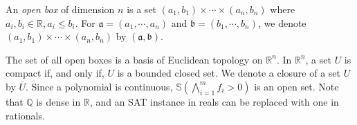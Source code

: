 \documentclass[runningheads,a4paper,oribibl]{llncs}
\newcommand{\Real}{{\mathbb R}}
\newcommand{\Rat}{{\mathbb Q}}
\newcommand{\suppress}[1]{} %
\begin{document}
\suppress{
\begin{definition} \label{def:poly}
A polynomial inequality is a bounded quantification 
$\exists x_1 \in I_1 \cdots x_n \in I_n. \psi(x_1,\cdots,x_n)$ 
such that 
\begin{itemize}
\item each $I_i$ is an open interval $x_i \in (a_i,b_i)$, and 
\item $\psi(x_1,\cdots,x_n)$ is a conjunction of $f_j > 0$ 
where $f_j$ is a polynomial over $\{x_1, \cdots, x_n\}$. 
\end{itemize}
$f_i > 0$ is called an atomic polynomial inequality (API). 
We denote $\mathbb{S}(F) = \{x \in \Real^n \mid F ~\text{holds}\}$.
\end{definition}

\begin{example} \label{examp:poly_ieq}
$\exists x \in (-1,3)~y \in (2,4) . (x^3y - y^4 > 0) \wedge (y^3 -xy >0)$
is an example of a polynomial inequality with 2 variables and 2 APIs. 
\end{example}
}

\begin{definition}
An \emph{open box} of dimension $n$ is a set $(a_1,b_1) \times \cdots \times (a_n,b_n)$ 
where $a_i, b_i \in \Real, a_i \leq b_i$.  
For $\mathfrak{a} = (a_1, \cdots, a_n)$ and $\mathfrak{b} = (b_1, \cdots, b_n)$, 
we denote $(a_1,b_1) \times \cdots \times (a_n,b_n)$ by $(\mathfrak{a}, \mathfrak{b})$. 
\end{definition}

The set of all open boxes is a basis of Euclidean topology on $\Real^n$. 
In $\Real^n$, a set $U$ is compact if, and only if, $U$ is a bounded closed set. 
We denote a closure of a set $U$ by $\overline{U}$. 
%
Since a polynomial is continuous, 
$\mathbb{S}(\bigwedge \limits_{i=1}^m f_i > 0)$ is an open set. 
Note that $\Rat$ is dense in $\Real$, and an SAT instance in reals can be replaced with one in rationals. 
\end{document}
